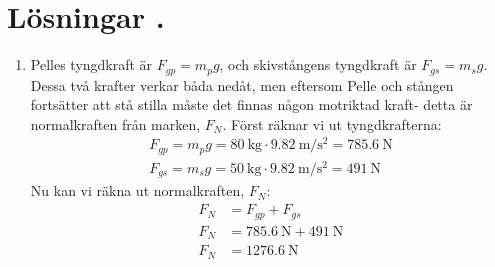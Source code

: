 \documentclass[12pt]{article}
\begin{document}
\section*{Lösningar \thesection.}
\begin{enumerate}
        \item
              \begin{minipage}[t]{0.5\textwidth}
                      Pelles tyngdkraft är $F_{gp} = m_pg$, och skivstångens tyngdkraft är $F_{gs} = m_sg$. Dessa två krafter verkar båda nedåt, men eftersom Pelle och stången fortsätter att stå stilla måste det finnas någon motriktad kraft- detta är normalkraften från marken, $F_{N}$. Först räknar vi ut tyngdkrafterna:
                      \begin{gather*}
                              F_{gp} = m_pg = \SI{80}{\kilogram} \cdot \SI{9.82}{\meter/\second\squared} = \SI{785.6}{\newton} \\
                              F_{gs} = m_sg = \SI{50}{\kilogram} \cdot \SI{9.82}{\meter/\second\squared} = \SI{491}{\newton}
                      \end{gather*}
                      Nu kan vi räkna ut normalkraften, $F_{N}$:
                      \begin{align*}
                              F_{N} & = F_{gp} + F_{gs}                         \\
                              F_{N} & = \SI{785.6}{\newton} + \SI{491}{\newton} \\
                              F_{N} & = \SI{1276.6}{\newton}
                      \end{align*}
              \end{minipage}
              \hfill
              \begin{minipage}[t]{0.4\textwidth}
                      \begin{adjustbox}{valign=t}
                              
                      \end{adjustbox}
              \end{minipage}
              \hfill
\end{enumerate}
\end{document}
